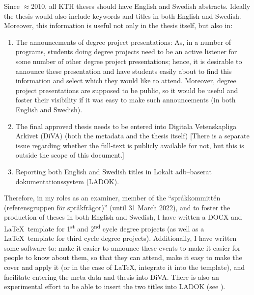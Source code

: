 Since $\approx$2010, all KTH theses should have English and Swedish abstracts. Ideally the thesis would also include keywords and titles in both English and Swedish. Moreover, this information is useful not only in the thesis itself, but also in:
\begin{enumerate}
    \item The announcements of degree project presentations: As, in a number of programs, students doing degree projects need to be an active listener for some number of other degree project presentations; hence, it is desirable to announce these presentation and have students easily about to find this information and select which they would like to attend. Moreover, degree project presentations are supposed to be public, so it would be useful and foster their visibility if it was easy to make such announcements (in both English and Swedish).
    \item The final approved thesis needs to be entered into Digitala Vetenskapliga Arkivet (DiVA) (both the metadata and the thesis itself) [There is a separate issue regarding whether the full-text is publicly available for not, but this is outside the scope of this document.]
    \item Reporting both English and Swedish titles in Lokalt adb–baserat dokumentationssystem (LADOK).
\end{enumerate}

Therefore, in my roles as an examiner, member of the “språkkommittén (referensgruppen för språkfrågor)” (until 31 March 2022), and to foster the production of theses in both English and Swedish, I have written a DOCX and \LaTeX~template for 1\textsuperscript{st} and 2\textsuperscript{nd} cycle degree projects (as well as a \LaTeX~template for third cycle degree projects). Additionally, I have written some software to: \first make it easier to announce these events to make it easier for people to know about them, so that they can attend, \Second make it easy to make the cover and apply it (or in the case of \LaTeX, integrate it into the template), and \third facilitate entering the meta data and thesis into DiVA. There is also an experimental effort to be able to insert the two titles into LADOK (see ).

